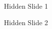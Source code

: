 \appendix

\begin{frame}[plain]
\end{frame}


\begin{frame}[plain]{Hidden Slide 1}
\end{frame}

\begin{frame}[plain]{Hidden Slide 2}
\end{frame}
